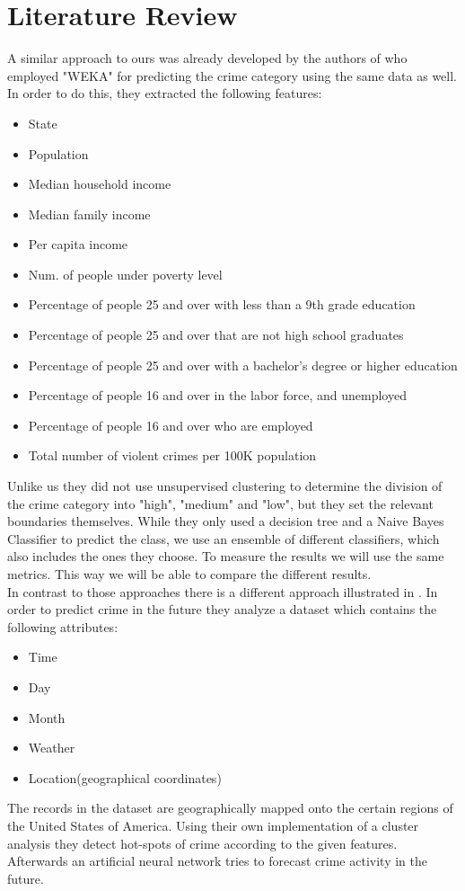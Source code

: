 \section{Literature Review}
A similar approach to ours was already developed by the authors of \cite{indian} who employed "WEKA" for predicting the crime category using the same data as well. In order to do this, they extracted the following features:

\begin{itemize}
	\setlength{\itemsep}{-2pt}
	\item State
	\item Population
	\item Median household income
	\item Median family income
	\item Per capita income
	\item Num. of people under poverty level
	\item Percentage of people 25 and over with less than a 9th grade education
	\item Percentage of people 25 and over that are not high school graduates
	\item Percentage of people 25 and over with a bachelor’s degree or higher education
	\item Percentage of people 16 and over in the labor force, and unemployed
	\item Percentage of people 16 and over who are employed
	\item Total number of violent crimes per 100K population
\end{itemize}

Unlike us they did not use unsupervised clustering to determine the division of the crime category into "high", "medium" and "low", but they set the relevant boundaries themselves. 
While they only used a decision tree and a Naive Bayes Classifier to predict the class, we use an ensemble of different classifiers, which also includes the ones they choose. 
To measure the results we will use the same metrics. This way we will be able to compare the different results. \\


\noindent In contrast to those approaches there is a different approach illustrated in \cite{forecast}. In order to predict crime in the future they analyze a dataset which contains the following attributes:
\begin{itemize}
	\setlength{\itemsep}{-2pt}
	\item Time
	\item Day
	\item Month
	\item Weather
	\item Location(geographical coordinates) 
\end{itemize}
The records in the dataset are geographically mapped onto the certain regions of the United States of America. Using their own implementation of a cluster analysis they detect hot-spots of crime according to the given features. Afterwards an artificial neural network tries to forecast crime activity in the future. 

\vspace*{\fill}